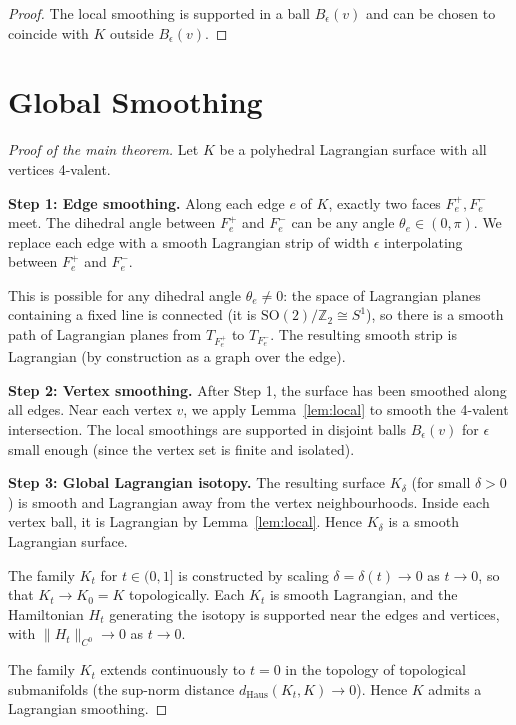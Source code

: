 \documentclass[12pt]{article}
\theoremstyle{definition}
\theoremstyle{remark}
\begin{document}
\begin{proof}
The local smoothing is supported in a ball $B_\epsilon(v)$ and can be chosen
to coincide with $K$ outside $B_\epsilon(v)$.
\end{proof}

\section{Global Smoothing}

\begin{proof}[Proof of the main theorem]
Let $K$ be a polyhedral Lagrangian surface with all vertices 4-valent.

\textbf{Step 1: Edge smoothing.}
Along each edge $e$ of $K$, exactly two faces $F_e^+, F_e^-$ meet.  The
dihedral angle between $F_e^+$ and $F_e^-$ can be any angle $\theta_e\in
(0,\pi)$.  We replace each edge with a smooth Lagrangian strip of width
$\epsilon$ interpolating between $F_e^+$ and $F_e^-$.

This is possible for any dihedral angle $\theta_e \neq 0$: the space of
Lagrangian planes containing a fixed line is connected (it is
$\mathrm{SO}(2)/\mathbb{Z}_2 \cong S^1$), so there is a smooth path of
Lagrangian planes from $T_{F_e^+}$ to $T_{F_e^-}$.  The resulting smooth
strip is Lagrangian (by construction as a graph over the edge).

\textbf{Step 2: Vertex smoothing.}
After Step 1, the surface has been smoothed along all edges.  Near each
vertex $v$, we apply Lemma~\ref{lem:local} to smooth the 4-valent intersection.
The local smoothings are supported in disjoint balls $B_\epsilon(v)$ for
$\epsilon$ small enough (since the vertex set is finite and isolated).

\textbf{Step 3: Global Lagrangian isotopy.}
The resulting surface $K_\delta$ (for small $\delta > 0$) is smooth and
Lagrangian away from the vertex neighbourhoods.  Inside each vertex ball,
it is Lagrangian by Lemma~\ref{lem:local}.  Hence $K_\delta$ is a smooth
Lagrangian surface.

The family $K_t$ for $t\in(0,1]$ is constructed by scaling $\delta = \delta(t)
\to 0$ as $t\to 0$, so that $K_t\to K_0 = K$ topologically.  Each $K_t$ is
smooth Lagrangian, and the Hamiltonian $H_t$ generating the isotopy is
supported near the edges and vertices, with $\|H_t\|_{C^0}\to 0$ as $t\to 0$.

The family $K_t$ extends continuously to $t=0$ in the topology of topological
submanifolds (the sup-norm distance $d_{\mathrm{Haus}}(K_t, K)\to 0$).
Hence $K$ admits a Lagrangian smoothing.
\end{proof}
\end{document}
